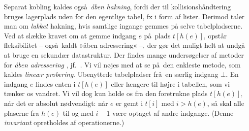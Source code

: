 Separat kobling kaldes også \emph{åben hakning},
fordi der til kollisionshåndtering bruges lagerplads uden for den egentlige tabel, fx i form af lister.
Derimod taler man om \emph{lukket} hakning, hvis samtlige ingange gemmes på selve tabelpladserne.
Ved at slække kravet om at gemme indgang $e$ på plads $t[h(e)]$, opstår fleksibilitet -- også kaldt »åben adressering« --, der gør det muligt helt at undgå at bruge en sekundær datastruktur.
Der findes mange undersøgelser af metoder for \emph{åben adressering} \cite{Pet57}, jf.~\cite[kap.~3.3]{GonBY1991}.
Vi vil nøjes med at se på den enkleste metode, som kaldes \emph{lineær probering}.
Ubenyttede tabelpladser frå en særlig indgang $\bot$.
En indgang $e$ findes enten i $t[h(e)]$ eller længere til højre i tabellen, som vi tænker os vandret.
Vi vil dog kun holde os fra den foretrukne plads $t[h(e)]$, når det er absolut nødvendigt:
når $e$ er gemt i $t[i]$ med $i>h(e)$, så skal alle plaserne fra  $h(e)$ til og med $i-1$ være optaget af andre indgange.
(Denne \emph{invariant}
opretholdes af operationerne.)

